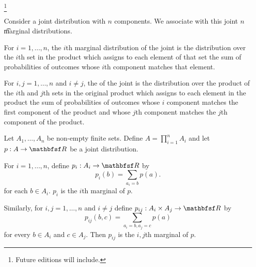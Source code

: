 
\footnote{Future editions will include.}


Consider a joint distribution with $n$ components.
We associate with this joint $n$ \t{marginal distributions}{}.

For $i = 1, \dots, n$, the
\t{$i$th marginal distribution} of
the joint is the distribution over
the $i$th set in the product which
assigns to each element of that set
the sum of probabilities of outcomes
whose $i$th component matches that
element.

For $i,j = 1, \dots, n$ and $i \neq j$, the
 of
the joint is the distribution over the
product of the $i$th and $j$th sets in the
original product which assigns to each element
in the product the sum of probabilities of outcomes
whose $i$ component matches the first component
of the product and whose $j$th component matches
the $j$th component of the product.



Let $A_1, \dots, A_n$ be
non-empty finite sets.
Define
$A = \prod_{i = 1}^{n} A_i$
and let $p: A \to \R$ be a joint distribution.

For $i = 1, \dots, n$,
define $p_i: A_i \to \R$ by
\[
  p_i(b) = \sum_{a_i = b} p(a).
\]
for each $b \in A_i$.
$p_i$ is the $i$th marginal of $p$.


Similarly,
for $i, j = 1, \dots, n$
and $i \neq j$ define
$p_{ij}: A_i \cross A_j \to \R$ by
\[
  p_{ij}(b, c) = \sum_{a_i = b, a_j = c} p(a)
\]
for every $b \in A_i$ and $c \in A_j$.
Then $p_{ij}$ is the $i,j$th marginal of $p$.
